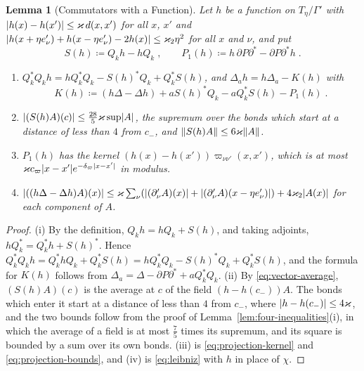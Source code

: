 \documentclass[11pt]{preprint}
\DeclarePairedDelimiter{\abs}{\lvert}{\rvert}
\DeclarePairedDelimiter{\norm}{\lVert}{\rVert}
\numberwithin{equation}{section}
\newtheorem{lemma}[theorem]{Lemma}
\theoremstyle{definition}
\theoremstyle{remark}
\theoremstyle{plain}
\begin{document}
\begin{lemma}[Commutators with a Function]\label{lem:commutators}
Let $h$ be a function on $T_\eta/\Gamma'$ with $\abs{h(x) - h(x')} \leq \varkappa\,d(x, x')$ for all $x$, $x'$ and $\abs{h(x + \eta e'_\nu) + h(x - \eta e'_\nu) - 2h(x)} \leq \varkappa_2\eta^2$ for all $x$ and $\nu$, and put
\begin{equation}\label{eq:commutators}
    S(h) \coloneqq Q_kh - hQ_k\;,
    \qquad
    P_1(h) \coloneqq h\,\partial P\partial^* - \partial P\partial^*h\;.
\end{equation}
\begin{enumerate}[label=(\roman*)]
\item $Q_k^*Q_kh = hQ_k^*Q_k - S(h)^*Q_k + Q_k^*S(h)$, and $\Delta_ah = h\Delta_a - K(h)$ with
\begin{equation}\label{eq:commutator-k}
    K(h) \coloneqq (h\Delta - \Delta h) + aS(h)^*Q_k - aQ_k^*S(h) - P_1(h)\;.
\end{equation}
\item $\abs{(S(h)A)(c)} \leq \frac{28}{5}\varkappa\sup\abs A$, the supremum over the bonds which start at a distance of less than $4$ from $c_-$, and $\norm{S(h)A} \leq 6\varkappa\norm{A}$.
\item $P_1(h)$ has the kernel $(h(x) - h(x'))\varpi_{\nu\nu'}(x, x')$, which is at most $\varkappa c_\varpi\abs{x - x'}e^{-\delta_\varpi\abs{x - x'}}$ in modulus.
\item $\abs{((h\Delta - \Delta h)A)(x)} \leq \varkappa\sum_\nu(\abs{(\partial'_\nu A)(x)} + \abs{(\partial'_\nu A)(x - \eta e'_\nu)}) + 4\varkappa_2\abs{A(x)}$ for each component of $A$.
\end{enumerate}
\end{lemma}

\begin{proof}
(i) By the definition, $Q_kh = hQ_k + S(h)$, and taking adjoints, $hQ_k^* = Q_k^*h + S(h)^*$. Hence $Q_k^*Q_kh = Q_k^*hQ_k + Q_k^*S(h) = hQ_k^*Q_k - S(h)^*Q_k + Q_k^*S(h)$, and the formula for $K(h)$ follows from $\Delta_a = \Delta - \partial P\partial^* + aQ_k^*Q_k$. (ii) By \eqref{eq:vector-average}, $(S(h)A)(c)$ is the average at $c$ of the field $(h - h(c_-))A$. The bonds which enter it start at a distance of less than $4$ from $c_-$, where $\abs{h - h(c_-)} \leq 4\varkappa$, and the two bounds follow from the proof of Lemma~\ref{lem:four-inequalities}(i), in which the average of a field is at most $\frac75$ times its supremum, and its square is bounded by a sum over its own bonds. (iii) is \eqref{eq:projection-kernel} and \eqref{eq:projection-bounds}, and (iv) is \eqref{eq:leibniz} with $h$ in place of $\chi$.
\end{proof}
\end{document}
